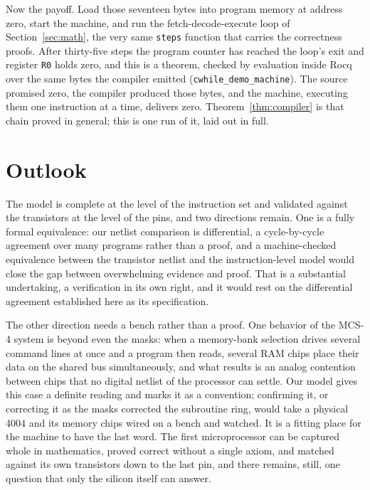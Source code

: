 \documentclass[11pt]{amsart}
\theoremstyle{plain}
\theoremstyle{definition}
\newcommand{\code}[1]{\texttt{#1}}
\begin{document}
Now the payoff. Load those seventeen bytes into program memory at address zero, start the machine, and run the fetch-decode-execute loop of Section~\ref{sec:math}, the very same \code{steps} function that carries the correctness proofs. After thirty-five steps the program counter has reached the loop's exit and register \code{R0} holds zero, and this is a theorem, checked by evaluation inside Rocq over the same bytes the compiler emitted (\code{cwhile\_demo\_machine}). The source promised zero, the compiler produced those bytes, and the machine, executing them one instruction at a time, delivers zero. Theorem~\ref{thm:compiler} is that chain proved in general; this is one run of it, laid out in full.

\section{Outlook}\label{sec:outlook}

The model is complete at the level of the instruction set and validated against the transistors at the level of the pins, and two directions remain. One is a fully formal equivalence: our netlist comparison is differential, a cycle-by-cycle agreement over many programs rather than a proof, and a machine-checked equivalence between the transistor netlist and the instruction-level model would close the gap between overwhelming evidence and proof. That is a substantial undertaking, a verification in its own right, and it would rest on the differential agreement established here as its specification.

The other direction needs a bench rather than a proof. One behavior of the MCS-4 system is beyond even the masks: when a memory-bank selection drives several command lines at once and a program then reads, several RAM chips place their data on the shared bus simultaneously, and what results is an analog contention between chips that no digital netlist of the processor can settle. Our model gives this case a definite reading and marks it as a convention; confirming it, or correcting it as the masks corrected the subroutine ring, would take a physical 4004 and its memory chips wired on a bench and watched. It is a fitting place for the machine to have the last word. The first microprocessor can be captured whole in mathematics, proved correct without a single axiom, and matched against its own transistors down to the last pin, and there remains, still, one question that only the silicon itself can answer.
\end{document}
